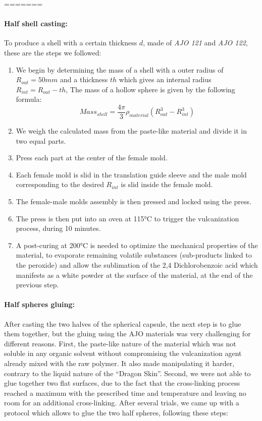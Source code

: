 =======
\paragraph{Half shell casting:}
To produce a shell with a certain thickness $d$, made of \emph{AJO 121} and \emph{AJO 122}, these are the steps we followed: 
\begin{enumerate}
	\item We begin by determining the mass of a shell with a outer radius of $R_{out}= 50 mm$ and a thickness $th$ which gives an internal radius $R_{int} = R_{out}-th$, The mass of a hollow sphere is given by the following formula:
		\[Mass_{shell} = \frac{4\pi}{3}\rho_{material} (R_{out}^3-R_{int}^3) \]

	\item We weigh the calculated mass from the paste-like material and divide it in two equal parts.
	\item Press each part at the center of the female mold.
	\item Each female mold is slid in the translation guide sleeve and the male mold corresponding to the desired $R_{int}$ is slid inside the female mold.
	\item The female-male molds assembly is then pressed and locked using the press.
	\item The press is then put into an oven at 115°C to trigger the vulcanization process, during 10 minutes.
	\item A post-curing at 200°C is needed to optimize the mechanical properties of the material, to evaporate remaining volatile substances (sub-products linked to the peroxide) and allow the sublimation of the 2,4 Dichlorobenzoic acid which manifests as a white powder at the surface of the material, at the end of the previous step.
\end{enumerate}

\paragraph{Half spheres gluing:}
After casting the two halves of the spherical capsule, the next step is to glue them together, but the gluing using the AJO materials was very challenging for different reasons. First, the paste-like nature of the material which was not soluble in any organic solvent without compromising the vulcanization agent already mixed with the raw polymer. It also made manipulating it harder, contrary to the liquid nature of the "`Dragon Skin"'. Second, we were not able to glue together two flat surfaces, due to the fact that the cross-linking process reached a maximum with the prescribed time and temperature and leaving no room for an additional cross-linking.
After several trials, we came up with a protocol which allows to glue the two half spheres, following these steps:

